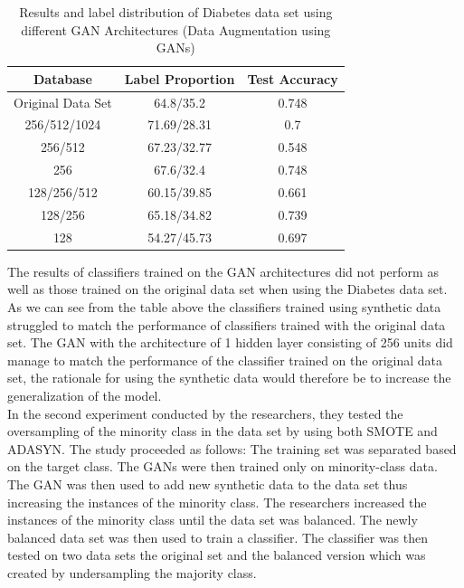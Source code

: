 \begin{table}[H]
    \centering
    \begin{tabular}{|c|c|c|}
    \hline
     Database 
     & Label Proportion
     & Test Accuracy\\
     \hline
         Original Data Set & 64.8/35.2 & 0.748\\
         256/512/1024 & 71.69/28.31 & 0.7\\
         256/512 & 67.23/32.77 & 0.548\\
         256 & 67.6/32.4 & 0.748\\
         128/256/512 & 60.15/39.85 & 0.661\\
         128/256 & 65.18/34.82 & 0.739\\
         128 & 54.27/45.73 & 0.697\\
    \hline
    \end{tabular}
    \caption{Results and label distribution of Diabetes data set using different GAN Architectures (Data Augmentation using GANs)\cite{litReviewGanDataAugmentation}}
    \label{tab:Results and label distribution of Diabetes Dataset using different GAN Architectures (Data Augmentation using GANs)}
\end{table}
The results of classifiers trained on the GAN architectures did not perform as well as those trained on the original data set when using the Diabetes data set.  As we can see from the table above the classifiers trained using synthetic data struggled to match the performance of classifiers trained with the original data set.  The GAN with the architecture of 1 hidden layer consisting of 256 units did manage to match the performance of the classifier trained on the original data set, the rationale for using the synthetic data would therefore be to increase the generalization of the model.
\\
In the second experiment conducted by the researchers, they tested the oversampling of the minority class in the data set by using both SMOTE and ADASYN.  The study proceeded as follows: The training set was separated based on the target class. The GANs were then trained only on minority-class data.  The GAN was then used to add new synthetic data to the data set thus increasing the instances of the minority class.  The researchers increased the instances of the minority class until the data set was balanced. The newly balanced data set was then used to train a classifier. The classifier was then tested on two data sets the original set and the balanced version which was created by undersampling the majority class.
